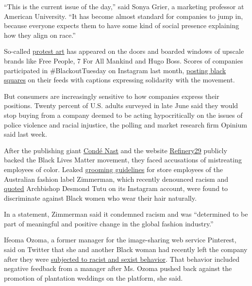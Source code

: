 ``This is the current issue of the day,'' said Sonya Grier, a marketing
professor at American University. ``It has become almost standard for
companies to jump in, because everyone expects them to have some kind of
social presence explaining how they align on race.''

So-called
\href{https://www.nytimes.com/2020/06/22/opinion/corporate-brands-protest-art.html?smid=tw-share}{protest
art} has appeared on the doors and boarded windows of upscale brands
like Free People, 7 For All Mankind and Hugo Boss. Scores of companies
participated in \#BlackoutTuesday on Instagram last month,
\href{https://www.nytimes.com/2020/06/20/travel/travel-brands-black-lives-matter.html}{posting
black squares} on their feeds with captions expressing solidarity with
the movement.

But consumers are increasingly sensitive to how companies express their
positions. Twenty percent of U.S. adults surveyed in late June said they
would stop buying from a company deemed to be acting hypocritically on
the issues of police violence and racial injustice, the polling and
market research firm Opinium said last week.

After the publishing giant
\href{https://www.nytimes.com/2020/06/13/business/media/conde-nast-racial.html}{Condé
Nast} and the website
\href{https://www.nytimes.com/2020/06/08/business/media/refinery-29-christene-barberich.html}{Refinery29}
publicly backed the Black Lives Matter movement, they faced accusations
of mistreating employees of color. Leaked
\href{https://www.instagram.com/p/CBL9hp9nTNr/?utm_source=ig_embed}{grooming
guidelines} for store employees of the Australian fashion label
Zimmerman, which recently denounced racism and
\href{https://www.instagram.com/p/CA4dPxXpThf/?utm_source=ig_web_copy_link}{quoted}
Archbishop Desmond Tutu on its Instagram account, were found to
discriminate against Black women who wear their hair naturally.

In a statement, Zimmerman said it condemned racism and was ``determined
to be part of meaningful and positive change in the global fashion
industry.''

Ifeoma Ozoma, a former manager for the image-sharing web service
Pinterest, said on Twitter that she and another Black woman had recently
left the company after they were
\href{https://twitter.com/erikashimizu/status/1272547227177713664}{subjected
to racist and sexist behavior}. That behavior included negative feedback
from a manager after Ms. Ozoma pushed back against the promotion of
plantation weddings on the platform, she said.

